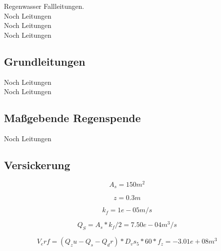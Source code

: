 \documentclass[12pt]{report}
\begin{document}
Regenwasser Fallleitungen.\\
Noch Leitungen\\
Noch Leitungen\\
Noch Leitungen\\

\subsection*{Grundleitungen}

Noch Leitungen\\
Noch Leitungen\\

\subsection*{Maßgebende Regenspende}

Noch Leitungen\\

\subsection*{Versickerung}

\begin{equation*}
A_s = 150 m^2
\end{equation*}

\begin{equation*}
z = 0.3 m
\end{equation*}


\begin{equation*}
k_f = 1e-05 m/s
\end{equation*}


\begin{equation*}
Q_S = A_s * k_f / 2 = 7.50e-04 m^3/s
\end{equation*}

\begin{equation*}
V_erf = (Q_zu - Q_s - Q_dr) * D_vs_5 * 60 * f_z = -3.01e+08 m^3
\end{equation*}
\end{document}
